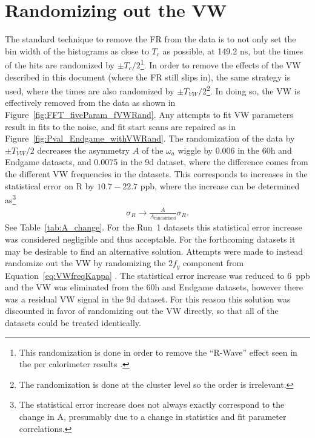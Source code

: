 \documentclass[12pt,letterpaper]{article}
\newcommand{\figref}[1]{Figure~\ref{#1}}
\def\wa{$\omega_{a}$\xspace}
\begin{document}
\clearpage

\section{Randomizing out the VW}
\label{sec:randomization}


The standard technique to remove the FR from the data is to not only set the bin width of the histograms as close to $T_{c}$ as possible, at 149.2 ns, but the times of the hits are randomized by $\pm T_{c}/2$\footnote{This randomization is done in order to remove the ``R-Wave'' effect seen in the per calorimeter results \cite{Rwave}.}. In order to remove the effects of the VW described in this document (where the FR still slips in), the same strategy is used, where the times are also randomized by $\pm T_{VW}/2$\footnote{The randomization is done at the cluster level so the order is irrelevant.}. In doing so, the VW is effectively removed from the data as shown in \figref{fig:FFT_fiveParam_fVWRand}. Any attempts to fit VW parameters result in fits to the noise, and fit start scans are repaired as in \figref{fig:Pval_Endgame_withVWRand}. The randomization of the data by $\pm T_{VW}/2$ decreases the asymmetry $A$ of the \wa wiggle by 0.006 in the 60h and Endgame datasets, and 0.0075 in the 9d dataset, where the difference comes from the different VW frequencies in the datasets. This corresponds to increases in the statistical error on R by $10.7 - 22.7$ ppb, where the increase can be determined as\footnote{The statistical error increase does not always exactly correspond to the change in A, presumably due to a change in statistics and fit parameter correlations.}
    \begin{align}
        \sigma_{R} \rightarrow \frac{A}{A_{\text{randomized}}}\sigma_{R}.
    \end{align}
See Table~\ref{tab:A_change}. For the Run~1 datasets this statistical error increase was considered negligible and thus acceptable. For the forthcoming datasets it may be desirable to find an alternative solution. Attempts were made to instead randomize out the VW by randomizing the $2f_{y}$ component from Equation~\ref{eq:VWfreqKappa} \cite{wa_presentation}. The statistical error increase was reduced to 6~ppb and the VW was eliminated from the 60h and Endgame datasets, however there was a residual VW signal in the 9d dataset. For this reason this solution was discounted in favor of randomizing out the VW directly, so that all of the datasets could be treated identically.
\end{document}
